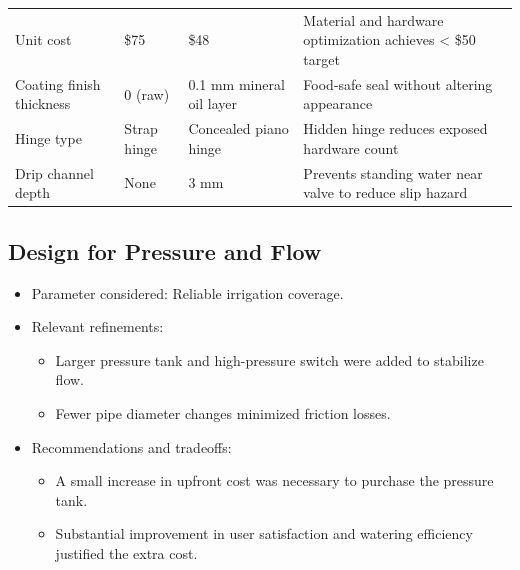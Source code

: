 \documentclass[12pt]{article}
\begin{document}
\begin{itemize}[leftmargin=1.5cm]
\begin{table}[h!]
{\begin{tabular}{p{3cm} p{2cm} p{2cm} p{8cm}}
      Unit cost                & \$75                   & \$48                       & Material and hardware optimization achieves < \$50 target            \\
      Coating finish thickness & 0 (raw)                & 0.1 mm mineral oil layer   & Food-safe seal without altering appearance                          \\
      Hinge type               & Strap hinge            & Concealed piano hinge      & Hidden hinge reduces exposed hardware count                          \\
      Drip channel depth       & None                   & 3 mm                       & Prevents standing water near valve to reduce slip hazard             \\
      \hline
    \end{tabular}
  }
\end{table}


\subsection{Design for Pressure and Flow}
\begin{itemize}[leftmargin=1.5cm]
    \item Parameter considered: Reliable irrigation coverage.
    \item Relevant refinements:
    \begin{itemize}
        \item Larger pressure tank and high-pressure switch were added to stabilize flow.
        \item Fewer pipe diameter changes minimized friction losses.
    \end{itemize}
    \item Recommendations and tradeoffs:
    \begin{itemize}
        \item A small increase in upfront cost was necessary to purchase the pressure tank.
        \item Substantial improvement in user satisfaction and watering efficiency justified the extra cost.
    \end{itemize}
\end{itemize}


\end{itemize}
\end{document}
